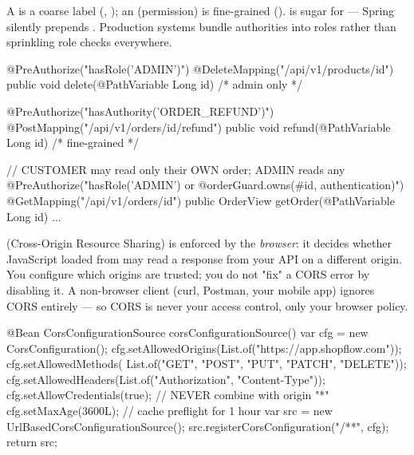 
 A  is a coarse label (, ); an  (permission) is fine-grained ().  is sugar for  --- Spring silently prepends . Production systems bundle authorities into roles rather than sprinkling role checks everywhere.

\begin{javabox}
@PreAuthorize("hasRole('ADMIN')")
@DeleteMapping("/api/v1/products/{id}")
public void delete(@PathVariable Long id) { /* admin only */ }

@PreAuthorize("hasAuthority('ORDER_REFUND')")
@PostMapping("/api/v1/orders/{id}/refund")
public void refund(@PathVariable Long id) { /* fine-grained */ }

// CUSTOMER may read only their OWN order; ADMIN reads any
@PreAuthorize("hasRole('ADMIN') or @orderGuard.owns(#id, authentication)")
@GetMapping("/api/v1/orders/{id}")
public OrderView getOrder(@PathVariable Long id) { ... }
\end{javabox}

  (Cross-Origin Resource Sharing) is enforced by the \emph{browser}: it decides whether JavaScript loaded from  may read a response from your API on a different origin. You configure which origins are trusted; you do not "fix" a CORS error by disabling it. A non-browser client (curl, Postman, your mobile app) ignores CORS entirely --- so CORS is never your access control, only your browser policy.

\begin{javabox}
@Bean
CorsConfigurationSource corsConfigurationSource() {
  var cfg = new CorsConfiguration();
  cfg.setAllowedOrigins(List.of("https://app.shopflow.com"));
  cfg.setAllowedMethods(
      List.of("GET", "POST", "PUT", "PATCH", "DELETE"));
  cfg.setAllowedHeaders(List.of("Authorization", "Content-Type"));
  cfg.setAllowCredentials(true);   // NEVER combine with origin "*"
  cfg.setMaxAge(3600L);            // cache preflight for 1 hour
  var src = new UrlBasedCorsConfigurationSource();
  src.registerCorsConfiguration("/**", cfg);
  return src;
}
\end{javabox}

